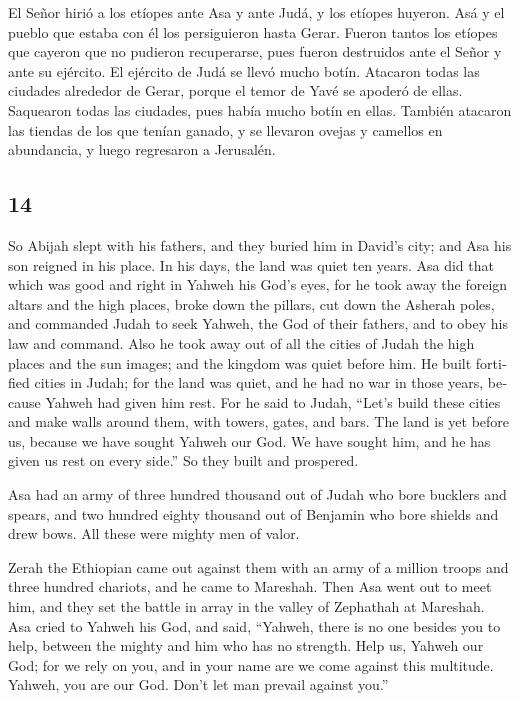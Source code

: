 \begin{paracol}{2}
 El Señor hirió a los etíopes ante Asa y ante Judá, y los
etíopes huyeron.  Asá y el pueblo que estaba con él los
persiguieron hasta Gerar. Fueron tantos los etíopes que cayeron que no
pudieron recuperarse, pues fueron destruidos ante el Señor y ante su
ejército. El ejército de Judá se llevó mucho botín. 
Atacaron todas las ciudades alrededor de Gerar, porque el temor de Yavé
se apoderó de ellas. Saquearon todas las ciudades, pues había mucho
botín en ellas.  También atacaron las tiendas de los que
tenían ganado, y se llevaron ovejas y camellos en abundancia, y luego
regresaron a Jerusalén.

\switchcolumn
\begin{otherlanguage}{english}

\hypertarget{section-27}{%
\section{14}\label{section-27}}

 So Abijah slept with his fathers, and they buried him in
David's city; and Asa his son reigned in his place. In his days, the
land was quiet ten years.  Asa did that which was good and
right in Yahweh his God's eyes,  for he took away the
foreign altars and the high places, broke down the pillars, cut down the
Asherah poles,  and commanded Judah to seek Yahweh, the
God of their fathers, and to obey his law and command. 
Also he took away out of all the cities of Judah the high places and the
sun images; and the kingdom was quiet before him.  He
built fortified cities in Judah; for the land was quiet, and he had no
war in those years, because Yahweh had given him rest. 
For he said to Judah, ``Let's build these cities and make walls around
them, with towers, gates, and bars. The land is yet before us, because
we have sought Yahweh our God. We have sought him, and he has given us
rest on every side.'' So they built and prospered.

 Asa had an army of three hundred thousand out of Judah
who bore bucklers and spears, and two hundred eighty thousand out of
Benjamin who bore shields and drew bows. All these were mighty men of
valor.

 Zerah the Ethiopian came out against them with an army of
a million troops and three hundred chariots, and he came to Mareshah.
 Then Asa went out to meet him, and they set the battle
in array in the valley of Zephathah at Mareshah.  Asa
cried to Yahweh his God, and said, ``Yahweh, there is no one besides you
to help, between the mighty and him who has no strength. Help us, Yahweh
our God; for we rely on you, and in your name are we come against this
multitude. Yahweh, you are our God. Don't let man prevail against you.''


\end{otherlanguage}
\end{paracol}
